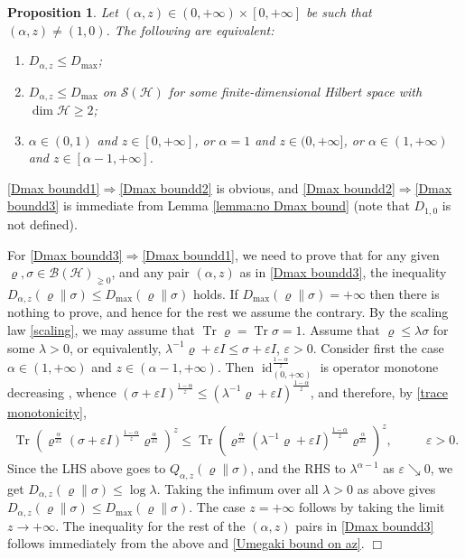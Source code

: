 \documentclass[unsortedaddress,superscriptaddress,pra,notitlepage]{revtex4}
\newtheorem{prop}[definition]{Proposition}
\newenvironment{proof}[1][Proof]{\begin{trivlist}
\item[\hskip \labelsep {\bfseries #1}]}{\hfill$\Box$\end{trivlist}}
\def\B{{\mathcal B}}
\def\S{{\mathcal S}}
\def\ep{\varepsilon}
\def\rho{\varrho}
\def\hil{{\mathcal H}}
\def\imp{\Longrightarrow}
\def\bz{\left(}
\def\jz{\right)}
\def\inv{^{-1}}
\def\pne{_{\gneq 0}}
\newcommand{\ds}{\mbox{ }\mbox{ }}
\DeclareMathOperator{\id}{id}
\DeclareMathOperator{\Tr}{Tr}
\begin{document}
\begin{prop}\label{prop:Dmax bound}
Let $(\alpha,z)\in(0,+\infty)\times[0,+\infty]$ be such that $(\alpha,z)\ne (1,0)$.
The following are equivalent:
\begin{enumerate}
\item\label{Dmax boundd1}
$D_{\alpha,z}\le D_{\max}$;
\item\label{Dmax boundd2}
$D_{\alpha,z}\le D_{\max}$ on $\S(\hil)$ for some 
finite-dimensional Hilbert space with $\dim\hil\ge 2$;
\item\label{Dmax boundd3}
$\alpha\in(0,1)$ and $z\in[0,+\infty]$, 
or $\alpha=1$ and $z\in(0,+\infty]$, or 
$\alpha\in(1,+\infty)$ and $z\in[\alpha-1,+\infty]$.
\end{enumerate}
\end{prop}
\begin{proof}
\ref{Dmax boundd1}$\imp$\ref{Dmax boundd2} is obvious, and 
\ref{Dmax boundd2}$\imp$\ref{Dmax boundd3} is immediate from Lemma \ref{lemma:no Dmax bound}
(note that $D_{1,0}$ is not defined).

For
\ref{Dmax boundd3}$\imp$\ref{Dmax boundd1},
we need to prove that for any given $\rho,\sigma\in\B(\hil)\pne$, and any 
pair $(\alpha,z)$ as in \ref{Dmax boundd3}, the inequality 
$D_{\alpha,z}(\rho\|\sigma)\le D_{\max}(\rho\|\sigma)$ holds.
If $D_{\max}(\rho\|\sigma)=+\infty$ then there is nothing to prove, and hence for the rest we assume the contrary. 
By the scaling law \eqref{scaling}, we may assume that 
$\Tr\rho=\Tr\sigma=1$.
Assume that $\rho\le\lambda\sigma$ for some $\lambda>0$, or equivalently, 
$\lambda\inv\rho+\ep I\le\sigma+\ep I$, $\ep>0$. 
Consider first the case 
$\alpha\in(1,+\infty)$ and $z\in(\alpha-1,+\infty)$.
Then 
$\id_{(0,+\infty)}^{\frac{1-\alpha}{z}}$ is operator monotone decreasing
\cite{Bhatia}, whence
$(\sigma+\ep I)^{\frac{1-\alpha}{z}}\le(\lambda\inv\rho+\ep I)^{\frac{1-\alpha}{z}}$, and therefore, by \eqref{trace monotonicity},
\begin{align*}
\Tr\bz\rho^{\frac{\alpha}{2z}}(\sigma+\ep I)^{\frac{1-\alpha}{z}}\rho^{\frac{\alpha}{2z}}\jz^z
\le
\Tr\bz\rho^{\frac{\alpha}{2z}}(\lambda\inv\rho+\ep I)^{\frac{1-\alpha}{z}}\rho^{\frac{\alpha}{2z}}\jz^z,\ds\ds\ep>0.
\end{align*}
Since the LHS above goes to $Q_{\alpha,z}(\rho\|\sigma)$, and the RHS to $\lambda^{\alpha-1}$ as 
$\ep\searrow 0$, we get $D_{\alpha,z}(\rho\|\sigma)\le\log\lambda$. 
Taking the 
infimum over all $\lambda>0$ as above gives 
$D_{\alpha,z}(\rho\|\sigma)\le D_{\max}(\rho\|\sigma)$.
The case $z=+\infty$ follows by taking the limit $z\to+\infty$. 
The inequality for the rest of the $(\alpha,z)$ pairs in 
\ref{Dmax boundd3} follows immediately from the above and \eqref{Umegaki bound on az}.
\end{proof}
\end{document}
